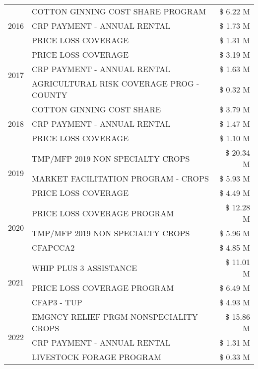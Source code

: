\begin{tabular}{llr}
\cline{1-3}
\multirow[t]{3}{*}{2016} & COTTON GINNING COST SHARE PROGRAM & \$ 6.22 M \\
 & CRP PAYMENT - ANNUAL RENTAL & \$ 1.73 M \\
 & PRICE LOSS COVERAGE & \$ 1.31 M \\
\cline{1-3}
\multirow[t]{3}{*}{2017} & PRICE LOSS COVERAGE & \$ 3.19 M \\
 & CRP PAYMENT - ANNUAL RENTAL & \$ 1.63 M \\
 & AGRICULTURAL RISK COVERAGE PROG - COUNTY & \$ 0.32 M \\
\cline{1-3}
\multirow[t]{3}{*}{2018} & COTTON GINNING COST SHARE & \$ 3.79 M \\
 & CRP PAYMENT - ANNUAL RENTAL & \$ 1.47 M \\
 & PRICE LOSS COVERAGE & \$ 1.10 M \\
\cline{1-3}
\multirow[t]{3}{*}{2019} & TMP/MFP 2019 NON SPECIALTY CROPS & \$ 20.34 M \\
 & MARKET FACILITATION PROGRAM - CROPS & \$ 5.93 M \\
 & PRICE LOSS COVERAGE & \$ 4.49 M \\
\cline{1-3}
\multirow[t]{3}{*}{2020} & PRICE LOSS COVERAGE PROGRAM & \$ 12.28 M \\
 & TMP/MFP 2019 NON SPECIALTY CROPS & \$ 5.96 M \\
 & CFAPCCA2 & \$ 4.85 M \\
\cline{1-3}
\multirow[t]{3}{*}{2021} & WHIP PLUS 3 ASSISTANCE & \$ 11.01 M \\
 & PRICE LOSS COVERAGE PROGRAM & \$ 6.49 M \\
 & CFAP3 - TUP & \$ 4.93 M \\
\cline{1-3}
\multirow[t]{3}{*}{2022} & EMGNCY RELIEF PRGM-NONSPECIALITY CROPS & \$ 15.86 M \\
 & CRP PAYMENT - ANNUAL RENTAL & \$ 1.31 M \\
 & LIVESTOCK FORAGE PROGRAM & \$ 0.33 M \\
\cline{1-3}
\bottomrule
\end{tabular}
